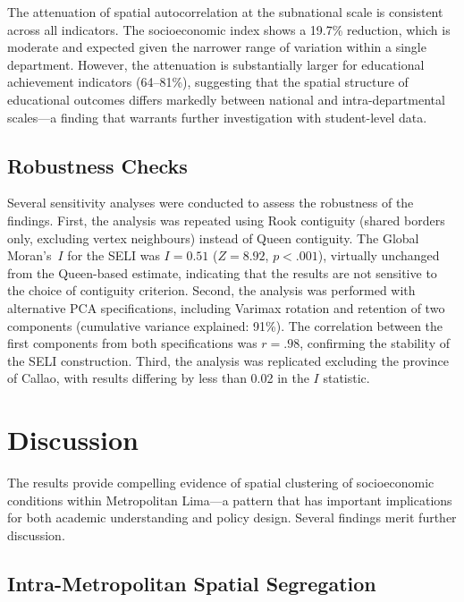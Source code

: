 \documentclass[12pt,a4paper,twoside]{article}
\begin{document}
The attenuation of spatial autocorrelation at the subnational scale is consistent
across all indicators. The socioeconomic index shows a 19.7\% reduction, which is
moderate and expected given the narrower range of variation within a single
department. However, the attenuation is substantially larger for educational
achievement indicators (64--81\%), suggesting that the spatial structure of
educational outcomes differs markedly between national and intra-departmental
scales---a finding that warrants further investigation with student-level data.

\subsection{Robustness Checks}

Several sensitivity analyses were conducted to assess the robustness of the
findings. First, the analysis was repeated using Rook contiguity (shared borders
only, excluding vertex neighbours) instead of Queen contiguity. The Global
Moran's~$I$ for the SELI was $I = 0.51$ ($Z = 8.92$, $p < .001$), virtually
unchanged from the Queen-based estimate, indicating that the results are not
sensitive to the choice of contiguity criterion. Second, the analysis was
performed with alternative PCA specifications, including Varimax rotation and
retention of two components (cumulative variance explained: 91\%). The
correlation between the first components from both specifications was $r = .98$,
confirming the stability of the SELI construction. Third, the analysis was
replicated excluding the province of Callao, with results differing by less
than 0.02 in the $I$ statistic.

\section{Discussion}

The results provide compelling evidence of spatial clustering of socioeconomic
conditions within Metropolitan Lima---a pattern that has important implications
for both academic understanding and policy design. Several findings merit
further discussion.

\subsection{Intra-Metropolitan Spatial Segregation}
\end{document}

